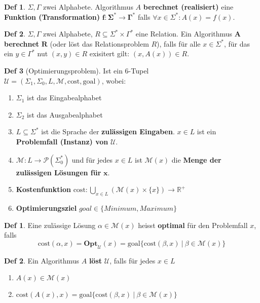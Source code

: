 \documentclass[a4paper, 10pt]{article}
\theoremstyle{definition}
\newtheorem{definition}{Def}[section]
\newtheorem*{definition*}{Def}
\newcommand{\R}{\mathbb{R}}
\newcommand{\words}{\Sigma^*}
\newcommand{\A}{\Sigma}
\newcommand{\op}{\mathcal{U}}
\newcommand{\cost}{\text{cost}}
\newcommand{\opm}{\mathcal{M}}
\newcommand{\goal}{\text{goal}}
\begin{document}
\begin{definition}
    \(\A, \Gamma\) zwei Alphabete. Algorithmus \(A\) \textbf{berechnet (realisiert)} eine \textbf{Funktion (Transformation)} \(\bm{f: \words \to \Gamma^*}\) falls \(\forall x \in \words: A(x) = f(x)\).
\end{definition}

\begin{definition}
    \(\A, \Gamma\) zwei Alphabete, \(R \subseteq \words \times \Gamma^*\) eine Relation. Ein Algorithmus \(\bm{A}\) \textbf{berechnet} \(\bm{R}\) (oder löst das Relationsproblem \(R\)), falls für alle \(x \in \words\), für das ein \(y \in \Gamma^*\) nut \((x, y) \in R\) exisitert gilt: \((x, A(x)) \in R\).
\end{definition}

\begin{definition}[Optimierungsproblem]
    Ist ein 6-Tupel \\
    \(\op = (\A_1, \A_0, L, \opm, \cost, \goal)\), wobei:
    \begin{enumerate}
        \item \(\A_1\) ist das Eingabealphabet
        \item \(\A_2\) ist das Ausgabealphabet
        \item \(L \subseteq \words\) ist die Sprache der \textbf{zulässigen Eingaben}. \(x \in L\) ist ein \textbf{Problemfall (Instanz) von} \(\bm{\op}\).
        \item \(\opm : L \to \mathcal{P}(\words_0)\) und für jedes \(x \in L\) ist \(\opm(x)\) die \textbf{Menge der zulässigen Lösungen für} \(\bm{x}\).
        \item \textbf{Kostenfunktion} \(\cost: \bigcup_{x \in L}(\opm(x) \times \{x\}) \to \R^+\)
        \item \textbf{Optimierungsziel} \(goal \in \{Minimum, Maximum\}\) 
    \end{enumerate}
\end{definition}

\begin{definition*}
    Eine zulässige Lösung \(\alpha \in \opm(x)\) heisst \textbf{optimal} für den Problemfall \(x\), falls \[\cost(\alpha, x) = \textbf{Opt}_\op(x) = \goal\{\cost(\beta, x) \ | \ \beta \in \opm(x)\}\]
\end{definition*}
\begin{definition*}
    Ein Algorithmus \(A\) \textbf{löst} \(\op\), falls für jedes \(x \in L\)
    \begin{enumerate}
        \item \(A(x) \in \opm(x)\)
        \item \(\cost(A(x), x) = \goal\{\cost(\beta, x) \ | \ \beta \in \opm(x)\}\)
    \end{enumerate}
\end{definition*}
\end{document}
